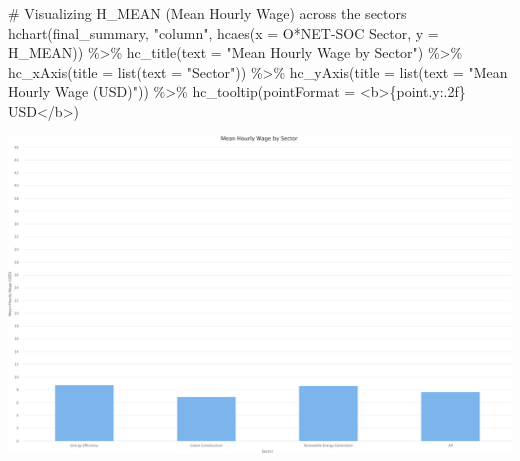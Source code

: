 \documentclass[
  letterpaper,
  DIV=11,
  numbers=noendperiod]{scrartcl}
\newenvironment{Shaded}{\begin{snugshade}}{\end{snugshade}}
\newcommand{\AttributeTok}[1]{\textcolor[rgb]{0.40,0.45,0.13}{#1}}
\newcommand{\CommentTok}[1]{\textcolor[rgb]{0.37,0.37,0.37}{#1}}
\newcommand{\FunctionTok}[1]{\textcolor[rgb]{0.28,0.35,0.67}{#1}}
\newcommand{\NormalTok}[1]{\textcolor[rgb]{0.00,0.23,0.31}{#1}}
\newcommand{\SpecialCharTok}[1]{\textcolor[rgb]{0.37,0.37,0.37}{#1}}
\newcommand{\StringTok}[1]{\textcolor[rgb]{0.13,0.47,0.30}{#1}}
\begin{document}
\begin{Shaded}
\begin{Highlighting}[]
\CommentTok{\# Visualizing H\_MEAN (Mean Hourly Wage) across the sectors}
\FunctionTok{hchart}\NormalTok{(final\_summary, }\StringTok{"column"}\NormalTok{, }\FunctionTok{hcaes}\NormalTok{(}\AttributeTok{x =} \StringTok{\textasciigrave{}}\AttributeTok{O*NET{-}SOC Sector}\StringTok{\textasciigrave{}}\NormalTok{, }\AttributeTok{y =}\NormalTok{ H\_MEAN)) }\SpecialCharTok{\%\textgreater{}\%}
  \FunctionTok{hc\_title}\NormalTok{(}\AttributeTok{text =} \StringTok{"Mean Hourly Wage by Sector"}\NormalTok{) }\SpecialCharTok{\%\textgreater{}\%}
  \FunctionTok{hc\_xAxis}\NormalTok{(}\AttributeTok{title =} \FunctionTok{list}\NormalTok{(}\AttributeTok{text =} \StringTok{"Sector"}\NormalTok{)) }\SpecialCharTok{\%\textgreater{}\%}
  \FunctionTok{hc\_yAxis}\NormalTok{(}\AttributeTok{title =} \FunctionTok{list}\NormalTok{(}\AttributeTok{text =} \StringTok{"Mean Hourly Wage (USD)"}\NormalTok{)) }\SpecialCharTok{\%\textgreater{}\%}
  \FunctionTok{hc\_tooltip}\NormalTok{(}\AttributeTok{pointFormat =} \StringTok{\textquotesingle{}\textless{}b\textgreater{}\{point.y:.2f\} USD\textless{}/b\textgreater{}\textquotesingle{}}\NormalTok{)}
\end{Highlighting}
\end{Shaded}

\includegraphics{index_files/figure-pdf/unnamed-chunk-13-2.pdf}
\end{document}
